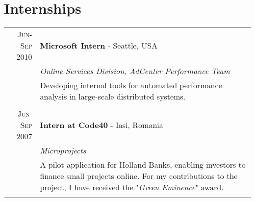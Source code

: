 \documentclass[a4paper,11pt]{article}
\begin{document}
%

\nocite{*}

\renewcommand{\refname}{Publications}


\section{Internships}
\begin{tabular}{r|p{12.3cm}}

\textsc{Jun-Sep 2010} & {\bf Microsoft Intern} - Seattle, USA \\
&\emph{Online Services Division, AdCenter Performance Team}\smallskip\\&\small{Developing internal tools for automated performance analysis in large-scale distributed systems.}\\\multicolumn{2}{c}{} \\

\textsc{Jun-Sep 2007} & {\bf Intern at Code40} - Iasi, Romania \\&\emph{Microprojects}\smallskip\\&\small{A pilot application for Holland Banks, enabling investors to finance small projects online. For my contributions to the project, I have received  the "\emph{Green Eminence}" award.} \\\multicolumn{2}{c}{} \\
\end{tabular}
\end{document}
